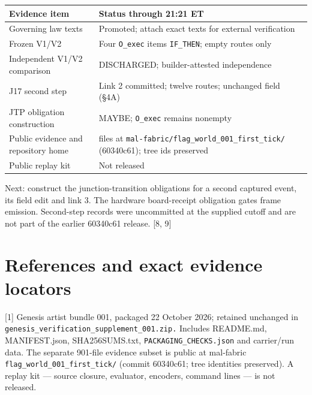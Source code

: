 \documentclass[
]{article}
\newcounter{none} %
\begin{document}
{\def\LTcaptype{none} %
\begin{longtable}[]{@{}
  >{\raggedright\arraybackslash}p{}
  >{\raggedright\arraybackslash}p{}@{}}
\toprule\noalign{}
\begin{minipage}[b]{\linewidth}\raggedright
\textbf{Evidence item}
\end{minipage} & \begin{minipage}[b]{\linewidth}\raggedright
\textbf{Status through 21:21 ET}
\end{minipage} \\
\midrule\noalign{}
\endhead
\bottomrule\noalign{}
\endlastfoot
Governing law texts & Promoted; attach exact texts for external
verification \\
Frozen V1/V2 & Four \nolinkurl{O_exec} items \nolinkurl{IF_THEN}; empty
routes only \\
Independent V1/V2 comparison & DISCHARGED; builder-attested
independence \\
J17 second step & Link 2 committed; twelve routes; unchanged field
(§4A) \\
JTP obligation construction & MAYBE; \nolinkurl{O_exec} remains
nonempty \\
Public evidence and repository home & 901 files at
\nolinkurl{mal-fabric/flag_world_001_first_tick/} (60340c61); tree ids
preserved \\
Public replay kit & Not released \\
\end{longtable}
}

Next: construct the junction-transition obligations for a second
captured event, its field edit and link 3. The hardware board-receipt
obligation gates frame emission. Second-step records were uncommitted at
the supplied cutoff and are not part of the earlier 60340c61 release.
{[}8, 9{]}

\section{References and exact evidence
locators}\label{references-and-exact-evidence-locators}

{[}1{]} Genesis artist bundle 001, packaged 22 October 2026; retained
unchanged in \nolinkurl{genesis_verification_supplement_001.zip.}
Includes README.md, MANIFEST.json, SHA256SUMS.txt,
\nolinkurl{PACKAGING_CHECKS.json} and carrier/run data. The separate
901-file evidence subset is public at mal-fabric
\nolinkurl{flag_world_001_first_tick/} (commit 60340c61; tree identities
preserved). A replay kit --- source closure, evaluator, encoders,
command lines --- is not released.
\end{document}
